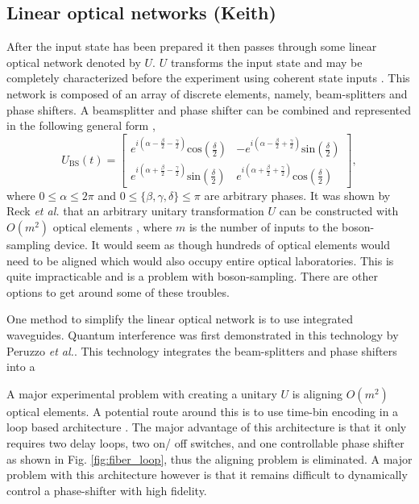 \documentclass[aps,pra,twocolumn,amsmath,amssymb,nofootinbib,superscriptaddress]{revtex4}
\begin{document}
\subsection{Linear optical networks (Keith)}
After the input state has been prepared it then passes through some linear optical network denoted by $U$. $U$ transforms the input state and may be completely characterized before the experiment using coherent state inputs \cite{bib:PhysRevLett.73.58}. This network is composed of an array of discrete elements, namely, beam-splitters and phase shifters.  A beamsplitter and phase shifter can be combined and represented in the following general form \cite{bib:GerryKnight05},
\begin{equation} \label{eq:BS}
U_{\mathrm{BS}}(t) = \left[ \begin{array}{cc}
e^{i(\alpha-\frac{\beta}{2}-\frac{\gamma}{2})}\mathrm{cos}\left(\frac{\delta}{2}\right) & -e^{i(\alpha-\frac{\beta}{2}+\frac{\gamma}{2})}\mathrm{sin}\left(\frac{\delta}{2}\right)  \\
e^{i(\alpha+\frac{\beta}{2}-\frac{\gamma}{2})}\mathrm{sin}\left(\frac{\delta}{2}\right) & e^{i(\alpha+\frac{\beta}{2}+\frac{\gamma}{2})}\mathrm{cos}\left(\frac{\delta}{2}\right)
\end{array} \right], 
\end{equation}
where $0\leq\alpha\leq2\pi$ and $0\leq\{\beta,\gamma,\delta\}\leq\pi$ are arbitrary phases. It was shown by Reck \emph{et al.} that an arbitrary unitary transformation $U$ can be constructed with  $O(m^2)$ optical elements \cite{bib:PhysRevLett.73.58}, where $m$ is the number of inputs to the boson-sampling device. It would seem as though hundreds of optical elements would need to be aligned which would also occupy entire optical laboratories. This is quite impracticable and is a problem with boson-sampling. There are other options to get around some of these troubles.  

One method to simplify the linear optical network is to use integrated waveguides. Quantum interference was first demonstrated in this technology by Peruzzo \emph{et al.}\cite{bib:peruzzo2011multimode}. This technology integrates the beam-splitters and phase shifters into a 

A major experimental problem with creating a unitary $U$ is aligning $O(m^2)$ optical elements. A potential route around this is to use time-bin encoding in a loop based architecture \cite{bib:motes2014scalable}. The major advantage of this architecture is that it only requires two delay loops, two on/ off switches, and one controllable phase shifter as shown in Fig. \ref{fig:fiber_loop}, thus the aligning problem is eliminated. A major problem with this architecture however is that it remains difficult to dynamically control a phase-shifter with high fidelity. 
\end{document}
